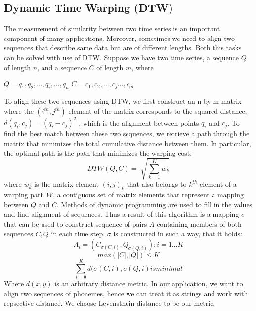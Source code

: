 \subsection{Dynamic Time Warping (DTW)}\cite{ratanamahatana2004everything}
The measurement of similarity between two time series is an important component of many applications.
Moreover, sometimes we need to align two sequences that describe same data but are of different lengths.
Both this tasks can be solved with use of DTW.
Suppose we have two time series, a sequence $Q$ of length $n$,
and a sequence $C$ of length $m$, where
\begin{center}
$Q = q_1 ,q_2 ,\dots, q_i ,\dots ,q_n$
\linebreak
$C = c_1 ,c_2 ,\dots, c_j \dots, c_m$
\end{center}
To align these two sequences using DTW, we first
construct an n-by-m matrix where the $(i^{th} , j^{th} )$ element of
the matrix corresponds to the squared distance, $d(q_i, c_j) =
(q_i - c_j )^2$ , which is the alignment between points $q_i$ and $c_j$.
To find the best match between these two sequences, we
retrieve a path through the matrix that minimizes the total
cumulative distance between them.
In particular, the optimal path is the path that minimizes the
warping cost:
\begin{equation}
DTW ( Q , C ) = \sqrt[]{\sum_{k=1}^{K}w_k}
\end{equation}
where $w_k$ is the matrix element $(i,j)_k$ that also belongs to $k^{th}$
element of a warping path $W$, a contiguous set of matrix
elements that represent a mapping between $Q$ and $C$.
Methods of dynamic programming are used to fill in the values and find alignment of sequences.
Thus a result of this algorithm is a mapping $\sigma$ that can be used to construct sequence of pairs $A$ containing members of both sequences $C,Q$ in each time step.
$\sigma$ is constructed in such a way, that it holds:
\begin{equation}
A_i = (C_{\sigma (C,i)}, Q_{\sigma (Q, i)}); i = 1 \dots K
\end{equation} 
\begin{equation}
max(|C|,|Q|) \le K
\end{equation}
\begin{equation}
\sum_{i=0}^K d(\sigma (C,i), \sigma(Q,i) is minimal
\end{equation}
Where $d(x,y)$ is an arbitrary distance metric.
In our application, we want to align two sequences of phonemes, hence we can treat it as strings and work with repsective distance.
We choose Levensthein distance to be our metric.
